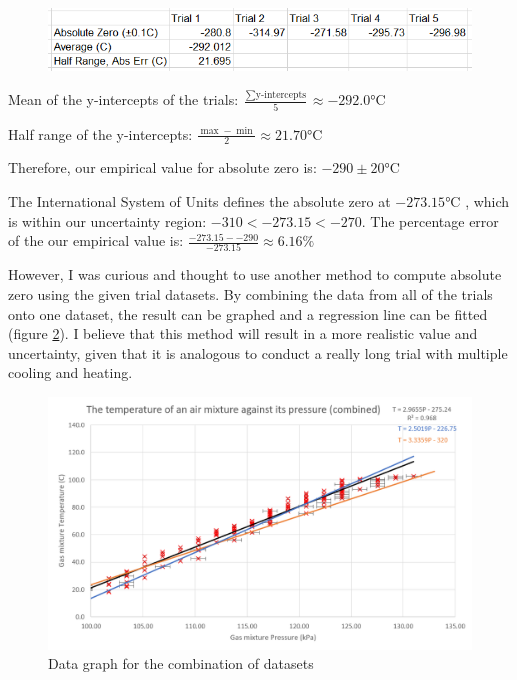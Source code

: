 \documentclass[a4paper,12pt]{article}
\begin{document}
\begin{figure}[H]
    \centering
    \includegraphics[scale=0.7]{assets/azerodata.png}
    \label{fig:yi}
\end{figure}


Mean of the y-intercepts of the trials: $\frac{\sum \text{y-intercepts}}{5} \approx -292.0 \si{\celsius}$

Half range of the y-intercepts: $\frac{\max - \min}{2} \approx 21.70 \si{\celsius}$

Therefore, our empirical value for absolute zero is: $-290 \pm 20 \si{\celsius}$

The International System of Units defines the absolute zero at $-273.15\si{\celsius}$ \parencite{si_form}, which is within our uncertainty region: $-310 < -273.15 < -270$. The percentage error of the our empirical value is: $\frac{-273.15- -290}{-273.15} \approx 6.16\%$

However, I was curious and thought to use another method to compute absolute zero using the given trial datasets. By combining the data from all of the trials onto one dataset, the result can be graphed and a regression line can be fitted (figure \ref{fig:comb}). I believe that this method will result in a more realistic value and uncertainty, given that it is analogous to conduct a really long trial with multiple cooling and heating.

\begin{figure}[H]
    \centering
    \includegraphics[width=\textwidth]{assets/combinedgraph.png}
    \caption{Data graph for the combination of datasets}
    \label{fig:comb}
\end{figure}
\end{document}
